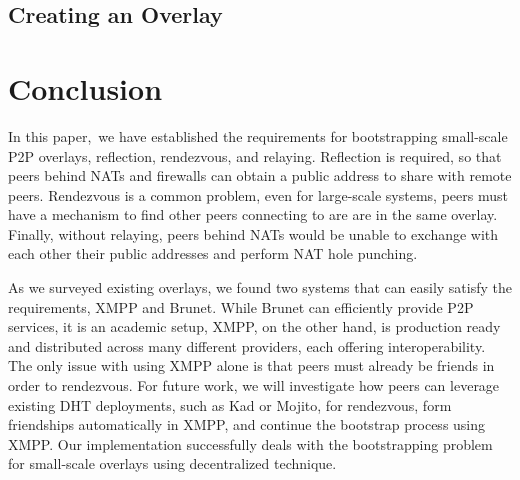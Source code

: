 \documentclass[conference]{IEEEtran}
\begin{document}
\subsection{Creating an Overlay}



\section{Conclusion}
\label{conclusions}

In this paper, we have established the requirements for bootstrapping small-scale
P2P overlays, reflection, rendezvous, and relaying.  Reflection is required, so
that peers behind NATs and firewalls can obtain a public address to share with
remote peers.  Rendezvous is a common problem, even for large-scale systems,
peers must have a mechanism to find other peers connecting to are are in the
same overlay.  Finally, without relaying, peers behind NATs would be unable to
exchange with each other their public addresses and perform NAT hole punching.

As we surveyed existing overlays, we found two systems that can easily satisfy
the requirements, XMPP and Brunet.  While Brunet can efficiently provide P2P
services, it is an academic setup, XMPP, on the other hand, is production ready
and distributed across many different providers, each offering
interoperability.  The only issue with using XMPP alone is that peers must
already be friends in order to rendezvous.  For future work, we will
investigate how peers can leverage existing DHT deployments, such as Kad or
Mojito, for rendezvous, form friendships automatically in XMPP, and continue
the bootstrap process using XMPP.  Our implementation successfully deals with
the bootstrapping problem for small-scale overlays using decentralized
technique.




\suppressfloats
\end{document}

